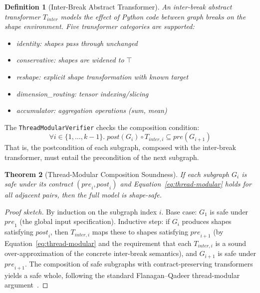 \documentclass[11pt]{article}
\newtheorem{theorem}{Theorem}
\newtheorem{definition}[theorem]{Definition}
\begin{document}
\begin{definition}[Inter-Break Abstract Transformer]\label{def:inter-break}
An \emph{inter-break abstract transformer} $T_{\mathit{inter}}$
models the effect of Python code between graph breaks on the shape
environment.  Five transformer categories are supported:
\begin{itemize}[nosep,leftmargin=2em]
  \item \textsf{identity}: shapes pass through unchanged
  \item \textsf{conservative}: shapes are widened to $\top$
  \item \textsf{reshape}: explicit shape transformation with known target
  \item \textsf{dimension\_routing}: tensor indexing/slicing
  \item \textsf{accumulator}: aggregation operations (sum, mean)
\end{itemize}
\end{definition}

The \texttt{ThreadModularVerifier} checks the composition condition:
\begin{equation}\label{eq:thread-modular}
  \forall i \in \{1, \ldots, k{-}1\}.\;
  \mathit{post}(G_i) \circ T_{\mathit{inter},i} \subseteq \mathit{pre}(G_{i+1})
\end{equation}
That is, the postcondition of each subgraph, composed with the
inter-break transformer, must entail the precondition of the
next subgraph.

\begin{theorem}[Thread-Modular Composition Soundness]\label{thm:thread-modular}
If each subgraph $G_i$ is safe under its contract
$(\mathit{pre}_i, \mathit{post}_i)$ and Equation~\eqref{eq:thread-modular}
holds for all adjacent pairs, then the full model is shape-safe.
\end{theorem}

\begin{proof}[Proof sketch]
By induction on the subgraph index $i$.  Base case: $G_1$ is safe
under $\mathit{pre}_1$ (the global input specification).  Inductive
step: if $G_i$ produces shapes satisfying $\mathit{post}_i$, then
$T_{\mathit{inter},i}$ maps these to shapes satisfying
$\mathit{pre}_{i+1}$ (by Equation~\eqref{eq:thread-modular} and the
requirement that each $T_{\mathit{inter},i}$ is a sound
over-approximation of the concrete inter-break semantics),
and $G_{i+1}$ is safe under $\mathit{pre}_{i+1}$.
The composition of safe subgraphs with contract-preserving transformers
yields a safe whole, following the standard Flanagan--Qadeer
thread-modular argument~\cite{flanagan03}.
\end{proof}
\end{document}
